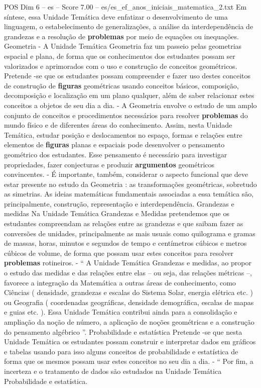 \begin{textsample}{POS Dim 6 – es – Score 7.00 – es/es\_ef\_anos\_iniciais\_matematica\_2.txt}
Em síntese, essa Unidade Temática deve enfatizar o desenvolvimento de uma linguagem, o estabelecimento de generalizações, a análise da interdependência de grandezas e a resolução de \textbf{problemas} por meio de equações ou inequações.
Geometria - A Unidade Temática Geometria faz um passeio pelas geometrias espacial e plana, de forma que os conhecimentos dos estudantes possam ser valorizados e aprimorados com o uso e construção de conceitos geométricos.
Pretende -se que os estudantes possam compreender e fazer uso destes conceitos de construção de \textbf{figuras} geométricas usando conceitos básicos, composição, decomposição e localização em um plano qualquer, além de saber relacionar estes conceitos a objetos de seu dia a dia. - A Geometria envolve o estudo de um amplo conjunto de conceitos e procedimentos necessários para resolver \textbf{problemas} do mundo físico e de diferentes áreas do conhecimento.
Assim, nesta Unidade Temática, estudar posição e deslocamentos no espaço, formas e relações entre elementos de \textbf{figuras} planas e espaciais pode desenvolver o pensamento geométrico dos estudantes.
Esse pensamento é necessário para investigar propriedades, fazer conjecturas e produzir \textbf{argumentos} geométricos convincentes. - É importante, também, considerar o aspecto funcional que deve estar presente no estudo da Geometria : as transformações geométricas, sobretudo as simetrias.
As ideias matemáticas fundamentais associadas a essa temática são, principalmente, construção, representação e interdependência.
Grandezas e medidas Na Unidade Temática Grandezas e Medidas pretendemos que os estudantes compreendam as relações entre as grandezas e que saibam fazer as conversões de unidades, principalmente as mais usuais como quilograma e gramas de massas, horas, minutos e segundos de tempo e centímetros cúbicos e metros cúbicos de volume, de forma que possam usar estes conceitos para resolver \textbf{problemas} rotineiros. - “ A Unidade Temática Grandezas e medidas, ao propor o estudo das medidas e das relações entre elas – ou seja, das relações métricas –, favorece a integração da Matemática a outras áreas de conhecimento, como Ciências ( densidade, grandezas e escalas do Sistema Solar, energia elétrica etc. ) ou Geografia ( coordenadas geográficas, densidade demográfica, escalas de mapas e guias etc. ).
Essa Unidade Temática contribui ainda para a consolidação e ampliação da noção de número, a aplicação de noções geométricas e a construção do pensamento algébrico ”.
Probabilidade e estatística Pretende -se que nesta Unidade Temática os estudantes possam construir e interpretar dados em gráficos e tabelas usando para isso alguns conceitos de probabilidade e estatística de forma que os mesmos possam usar estes conceitos no seu dia a dia. - “ Por fim, a incerteza e o tratamento de dados são estudados na Unidade Temática Probabilidade e estatística.

\end{textsample}
